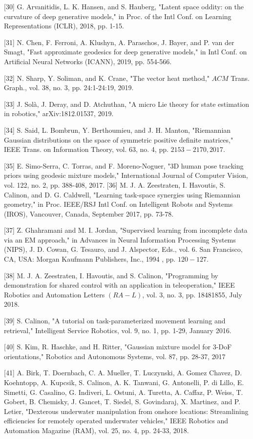 \documentclass[10pt]{article}
\begin{document}
[30] G. Arvanitidis, L. K. Hansen, and S. Hauberg, "Latent space oddity: on the curvature of deep generative models," in Proc. of the Intl Conf. on Learning Representations (ICLR), 2018, pp. 1-15.

[31] N. Chen, F. Ferroni, A. Klushyn, A. Paraschos, J. Bayer, and P. van der Smagt, "Fast approximate geodesics for deep generative models," in Intl Conf. on Artificial Neural Networks (ICANN), 2019, pp. 554-566.

[32] N. Sharp, Y. Soliman, and K. Crane, "The vector heat method," $A C M$ Trans. Graph., vol. 38, no. 3, pp. 24:1-24:19, 2019.

[33] J. Solà, J. Deray, and D. Atchuthan, "A micro Lie theory for state estimation in robotics," arXiv:1812.01537, 2019.

[34] S. Said, L. Bombrun, Y. Berthoumieu, and J. H. Manton, "Riemannian Gaussian distributions on the space of symmetric positive definite matrices," IEEE Trans. on Information Theory, vol. 63, no. 4, pp. $2153-2170,2017$.

[35] E. Simo-Serra, C. Torras, and F. Moreno-Noguer, "3D human pose tracking priors using geodesic mixture models," International Journal of Computer Vision, vol. 122, no. 2, pp. 388-408, 2017. [36] M. J. A. Zeestraten, I. Havoutis, S. Calinon, and D. G. Caldwell, "Learning task-space synergies using Riemannian geometry," in Proc. IEEE/RSJ Intl Conf. on Intelligent Robots and Systems (IROS), Vancouver, Canada, September 2017, pp. 73-78.

[37] Z. Ghahramani and M. I. Jordan, "Supervised learning from incomplete data via an EM approach," in Advances in Neural Information Processing Systems (NIPS), J. D. Cowan, G. Tesauro, and J. Alspector, Eds., vol. 6. San Francisco, CA, USA: Morgan Kaufmann Publishers, Inc., 1994 , pp. $120-127$.

[38] M. J. A. Zeestraten, I. Havoutis, and S. Calinon, "Programming by demonstration for shared control with an application in teleoperation," IEEE Robotics and Automation Letters $(R A-L)$, vol. 3, no. 3, pp. 18481855, July 2018.

[39] S. Calinon, "A tutorial on task-parameterized movement learning and retrieval," Intelligent Service Robotics, vol. 9, no. 1, pp. 1-29, January 2016.

[40] S. Kim, R. Haschke, and H. Ritter, "Gaussian mixture model for 3-DoF orientations," Robotics and Autonomous Systems, vol. 87, pp. 28-37, 2017

[41] A. Birk, T. Doernbach, C. A. Mueller, T. Luczynski, A. Gomez Chavez, D. Koehntopp, A. Kupcsik, S. Calinon, A. K. Tanwani, G. Antonelli, P. di Lillo, E. Simetti, G. Casalino, G. Indiveri, L. Ostuni, A. Turetta, A. Caffaz, P. Weiss, T. Gobert, B. Chemisky, J. Gancet, T. Siedel, S. Govindaraj, X. Martinez, and P. Letier, "Dexterous underwater manipulation from onshore locations: Streamlining efficiencies for remotely operated underwater vehicles," IEEE Robotics and Automation Magazine (RAM), vol. 25, no. 4, pp. 24-33, 2018.
\end{document}
